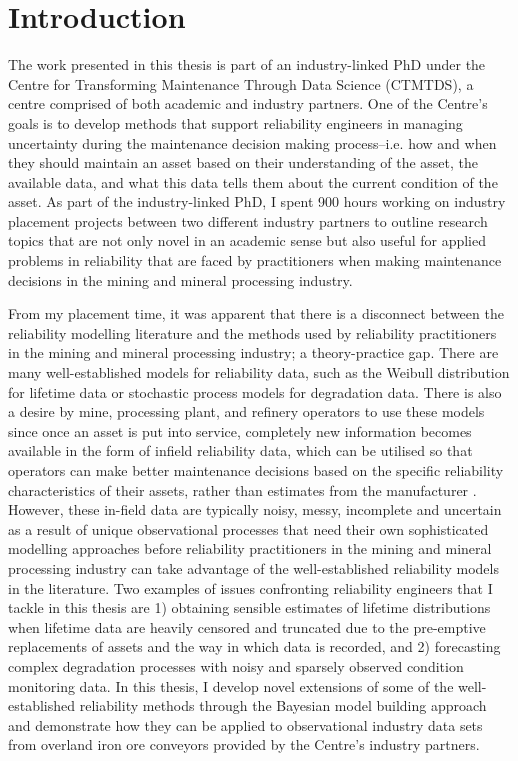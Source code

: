 \chapter{Introduction}\label{chap:chapter1}

The work presented in this thesis is part of an industry-linked PhD under the Centre for Transforming Maintenance Through Data Science (CTMTDS), a centre comprised of both academic and industry partners. One of the Centre's goals is to develop methods that support reliability engineers in managing uncertainty during the maintenance decision making process--i.e. how and when they should maintain an asset based on their understanding of the asset, the available data, and what this data tells them about the current condition of the asset. As part of the industry-linked PhD, I spent 900 hours working on industry placement projects between two different industry partners to outline research topics that are not only novel in an academic sense but also useful for applied problems in reliability that are faced by practitioners when making maintenance decisions in the mining and mineral processing industry.

From my placement time, it was apparent that there is a disconnect between the reliability modelling literature and the methods used by reliability practitioners in the mining and mineral processing industry; a theory-practice gap. There are many well-established models for reliability data, such as the Weibull distribution for lifetime data or stochastic process models for degradation data. There is also a desire by mine, processing plant, and refinery operators to use these models since once an asset is put into service, completely new information becomes available in the form of infield reliability data, which can be utilised so that operators can make better maintenance decisions based on the specific reliability characteristics of their assets, rather than estimates from the manufacturer \citep{jardine2013}. However, these in-field data are typically noisy, messy, incomplete and uncertain as a result of unique observational processes that need their own sophisticated modelling approaches before reliability practitioners in the mining and mineral processing industry can take advantage of the well-established reliability models in the literature. Two examples of issues confronting reliability engineers that I tackle in this thesis are 1) obtaining sensible estimates of lifetime distributions when lifetime data are heavily censored and truncated due to the pre-emptive replacements of assets and the way in which data is recorded, and 2) forecasting complex degradation processes with noisy and sparsely observed condition monitoring data. In this thesis, I develop novel extensions of some of the well-established reliability methods through the Bayesian model building approach \citep{gelman_workflow_2020} and demonstrate how they can be applied to observational industry data sets from overland iron ore conveyors provided by the Centre's industry partners.

